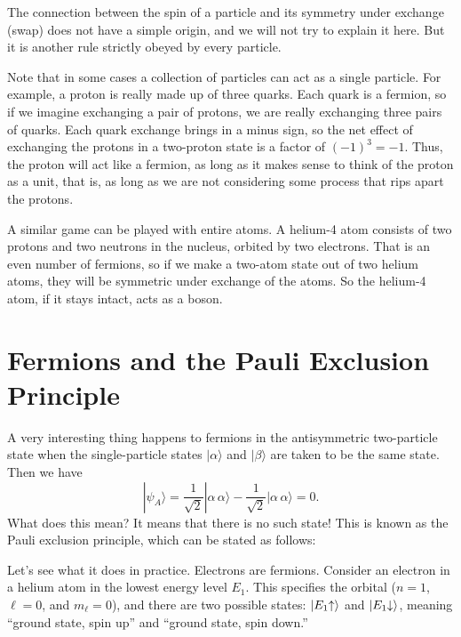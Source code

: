 The connection between the spin of a particle and its symmetry under
exchange (swap) does not have a simple origin, and we will not try to
explain it here.  But it is another rule strictly obeyed by every
particle.

Note that in some cases a collection of particles can act as a single
particle.  For example, a proton is really made up of three quarks.
Each quark is a fermion, so if we imagine exchanging a pair of
protons, we are really exchanging three pairs of quarks.  Each quark
exchange brings in a minus sign, so the net effect of exchanging the
protons in a two-proton state is a factor of $(-1)^3=-1$.  Thus, the proton
will act like a fermion, as long as it makes sense to think of the
proton as a unit, that is, as long as we are not considering some process
that rips apart the protons.

A similar game can be played with entire atoms.  A helium-4 atom
consists of two protons and two neutrons in the nucleus, orbited
by two electrons.  That is an even number of fermions, so if we make a
two-atom state out of two helium atoms, they will be symmetric under
exchange of the atoms.  So the helium-4 atom, if it stays intact, acts
as a boson.

\section{Fermions and the Pauli Exclusion Principle}

A very interesting thing happens to fermions in the antisymmetric
two-particle state when the single-particle states $|\alpha\rangle$
and $|\beta\rangle$ are taken to be the same state.  Then we have
\begin{equation}
  |\psi_A\rangle =  \frac{1}{\sqrt 2}|\alpha\, \alpha\rangle - 
  \frac{1}{\sqrt 2}|\alpha\, \alpha\rangle
  = 0.
\end{equation}
What does this mean?  It means that there is no such state!  This is
known as the Pauli exclusion principle, which can be stated as
follows:


Let's see what it does in practice.  Electrons are fermions.  Consider
an electron in a helium atom in the lowest energy level $E_1$. This
specifies the orbital ($n=1$, $\ell=0$, and $m_\ell=0$), and there are
two possible states: $|E_1\hspace{-1mm}\uparrow\rangle$ and
$|E_1\hspace{-1mm}\downarrow\rangle$, meaning ``ground state,
spin up'' and ``ground state, spin down.''

